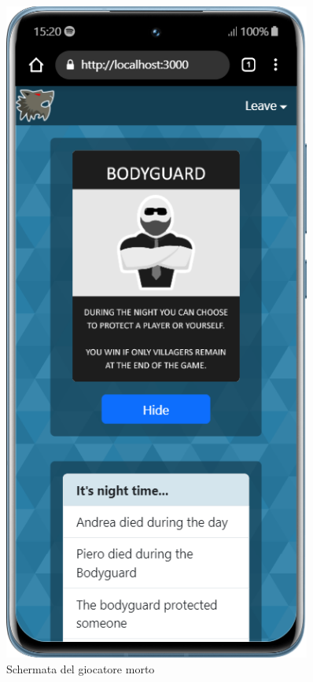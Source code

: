 \begin{figure}[H]
    \centering
    \begin{minipage}{0.45\textwidth}
        \centering
        \includegraphics[width=0.9\textwidth]{img/screen/mobile/dead_mobile.png}
        \caption{Schermata del giocatore morto}
        \label{fig:dead_mobile}

\end{minipage}
\end{figure}
